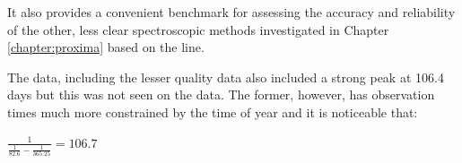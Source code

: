 It also provides a convenient benchmark for assessing the accuracy and reliability of the other, less clear
spectroscopic methods investigated in Chapter \ref{chapter:proxima} based on the {\ha} line.

The {\asas} data, including the lesser quality data also included a strong peak at 106.4 days but this was not seen on
the {\hst} data. The former, however, has observation times much more constrained by the time of year and it is
noticeable that:

\begin{center}

$ \frac{1}{\frac{1}{82.6} - \frac{1}{365.25}} = 106.7 $

\end{center}

